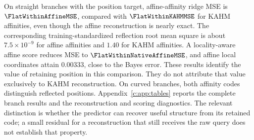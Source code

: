On straight branches with the position target, affine-affinity ridge MSE
is $\FlatWithinAffineMSE$, compared with $\FlatWithinKAHMMSE$ for KAHM
affinities, even though the affine reconstruction is nearly exact. The
corresponding training-standardized reflection root mean square is about
$7.5\times10^{-9}$ for affine affinities and $1.40$ for KAHM affinities.
A locality-aware affine score reduces MSE to
$\FlatWithinNativeAffineMSE$, and affine local coordinates attain
$0.00333$, close to the Bayes error. These results identify the value of
retaining position in this comparison. They do not attribute that value
exclusively to KAHM reconstruction. On curved branches, both affinity codes
distinguish reflected positions. Appendix~\ref{c:app:tables} reports the
complete branch results and the reconstruction and scoring diagnostics.
The relevant distinction is whether the predictor can recover useful
structure from its retained code; a small residual for a reconstruction
that still receives the raw query does not establish that property.
